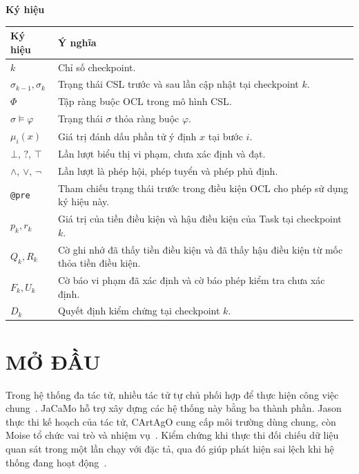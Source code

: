\documentclass[12pt,a4paper,oneside]{extreport}
\newcommand{\listalgorithmname}{DANH MỤC THUẬT TOÁN}
\begin{document}
\medskip
\noindent\textbf{Ký hiệu}\par\nopagebreak[4]
\noindent
\begin{tabular}{@{}p{.20\linewidth}>{\raggedright\arraybackslash}p{.77\linewidth}@{}}
\toprule
\textbf{Ký hiệu} & \textbf{Ý nghĩa} \\
\midrule
\(k\) & Chỉ số checkpoint. \\
\(\sigma_{k-1}, \sigma_k\) & Trạng thái CSL trước và sau lần cập nhật tại checkpoint \(k\). \\
\(\Phi\) & Tập ràng buộc OCL trong mô hình CSL. \\
\(\sigma \vDash \varphi\) & Trạng thái \(\sigma\) thỏa ràng buộc \(\varphi\). \\
\(\mu_i(x)\) & Giá trị đánh dấu phần tử ý định \(x\) tại bước \(i\). \\
\(\bot,\,?,\,\top\) & Lần lượt biểu thị vi phạm, chưa xác định và đạt. \\
\(\land,\,\lor,\,\neg\) & Lần lượt là phép hội, phép tuyển và phép phủ định. \\
\texttt{@pre} & Tham chiếu trạng thái trước trong điều kiện OCL cho phép sử dụng ký hiệu này. \\
\(p_k, r_k\) & Giá trị của tiền điều kiện và hậu điều kiện của Task tại checkpoint \(k\). \\
\(Q_k, R_k\) & Cờ ghi nhớ đã thấy tiền điều kiện và đã thấy hậu điều kiện từ mốc thỏa tiền điều kiện. \\
\(F_k, U_k\) & Cờ báo vi phạm đã xác định và cờ báo phép kiểm tra chưa xác định. \\
\(D_k\) & Quyết định kiểm chứng tại checkpoint \(k\). \\
\bottomrule
\end{tabular}
\par
\endgroup

\listoffigures
\listoftables
\tocfile{\listalgorithmname}{loa}

\chapter*{MỞ ĐẦU}\label{mo-dau}

Trong hệ thống đa tác tử, nhiều tác tử tự chủ phối hợp để thực hiện công việc chung~\cite{ref-1}. JaCaMo hỗ trợ xây dựng các hệ thống này bằng ba thành phần. Jason thực thi kế hoạch của tác tử, CArtAgO cung cấp môi trường dùng chung, còn Moise tổ chức vai trò và nhiệm vụ~\cite{ref-2}. Kiểm chứng khi thực thi đối chiếu dữ liệu quan sát trong một lần chạy với đặc tả, qua đó giúp phát hiện sai lệch khi hệ thống đang hoạt động~\cite{ref-5}.
\end{document}
